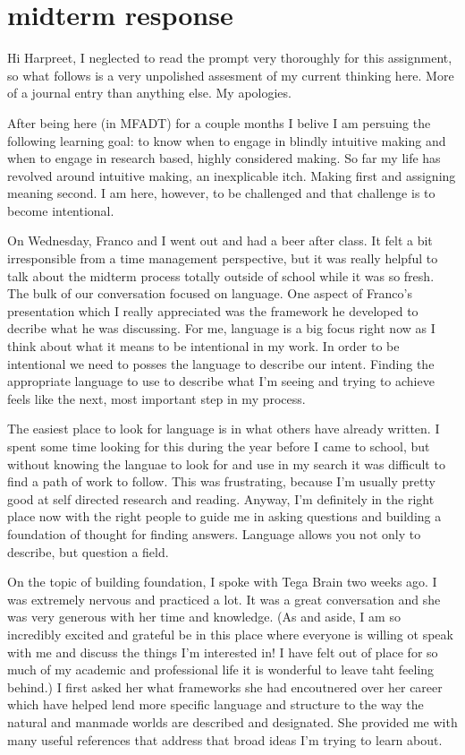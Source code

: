 \documentclass[11pt]{report}
\begin{document}
\clearpage
\section*{midterm response}

Hi Harpreet, I neglected to read the prompt very thoroughly for this assignment, so what follows is a very unpolished assesment of my current thinking here. More of a journal entry than anything else. My apologies.

After being here (in MFADT) for a couple months I belive I am persuing the following learning goal: to know when to engage in blindly intuitive making and when to engage in research based, highly considered making. So far my life has revolved around intuitive making, an inexplicable itch. Making first and assigning meaning second. I am here, however, to be challenged and that challenge is to become intentional.

On Wednesday, Franco and I went out and had a beer after class. It felt a bit irresponsible from a time management perspective, but it was really helpful to talk about the midterm process totally outside of school while it was so fresh. The bulk of our conversation focused on language. One aspect of Franco's presentation which I really appreciated was the framework he developed to decribe what he was discussing. For me, language is a big focus right now as I think about what it means to be intentional in my work. In order to be intentional we need to posses the language to describe our intent. Finding the appropriate language to use to describe what I'm seeing and trying to achieve feels like the next, most important step in my process.  

The easiest place to look for language is in what others have already written. I spent some time looking for this during the year before I came to school, but without knowing the languae to look for and use in my search it was difficult to find a path of work to follow. This was frustrating, because I'm usually pretty good at self directed research and reading. Anyway, I'm definitely in the right place now with the right people to guide me in asking questions and building a foundation of thought for finding answers. Language allows you not only to describe, but question a field. 

On the topic of building foundation, I spoke with Tega Brain two weeks ago. I was extremely nervous and practiced a lot. It was a great conversation and she was very generous with her time and knowledge. (As and aside, I am so incredibly excited and grateful be in this place where everyone is willing ot speak with me and discuss the things I'm interested in! I have felt out of place for so much of my academic and professional life it is wonderful to leave taht feeling behind.) I first asked her what frameworks she had encoutnered over her career which have helped lend more specific language and structure to the way the natural and manmade worlds are described and designated. She provided me with many useful references that address that broad ideas I'm trying to learn about. 
\end{document}
